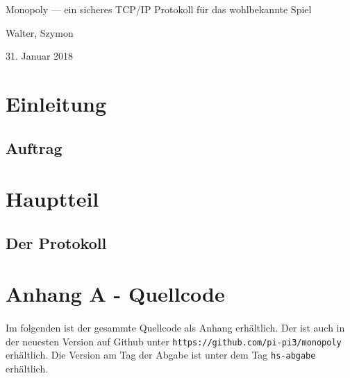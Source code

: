 \documentclass[12pt,titlepage,oneside]{article}
\title{\thetitle}
\author{\theauthor}
\date{\thedate}
\newcommand{\thetitle}{Monopoly --- ein sicheres TCP/IP Protokoll für das wohlbekannte Spiel}
\newcommand{\theauthor}{Walter, Szymon}
\newcommand{\thedate}{31. Januar 2018}
\begin{document}
    \begin{titlepage}
        \centering
        \vspace{10cm}
        {\LARGE \thetitle\par}
        \vspace{2cm}
        {\large \theauthor\par}
        {\large \thedate\par}
    \end{titlepage}

    \setcounter{page}{2}
    \tableofcontents
    \clearpage

    \setcounter{page}{1}

    \section{Einleitung}

    \subsection{Auftrag}
    \paragraph{}

    \section{Hauptteil}
    
    \subsection{Der Protokoll}
    \paragraph{}

    \clearpage
    \section*{Anhang A - Quellcode}
    \paragraph{}
        Im folgenden ist der gesammte Quellcode als Anhang erhältlich.  Der ist
        auch in der neuesten Version auf Github unter
        \verb`https://github.com/pi-pi3/monopoly` erhältlich.  Die Version am
        Tag der Abgabe ist unter dem Tag \verb`hs-abgabe` erhältlich.
\end{document}
